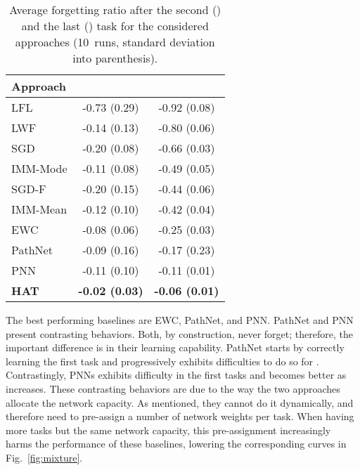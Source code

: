 \begin{table}[t]
    \caption{Average forgetting ratio after the second () and the last () task for the considered approaches (10~runs, standard deviation into parenthesis).}
    \label{tab:mixture0}
\begin{center}
    \begin{small}
    \begin{sc}
    \begin{tabular}{lcc}
    \toprule
    Approach &  &  \\
    \midrule
LFL          & -0.73 (0.29) & -0.92 (0.08) \\
LWF          & -0.14 (0.13) & -0.80 (0.06) \\
SGD          & -0.20 (0.08) & -0.66 (0.03) \\
IMM-Mode     & -0.11 (0.08) & -0.49 (0.05) \\
SGD-F        & -0.20 (0.15) & -0.44 (0.06) \\
IMM-Mean     & -0.12 (0.10) & -0.42 (0.04) \\
EWC          & -0.08 (0.06) & -0.25 (0.03) \\
PathNet      & -0.09 (0.16) & -0.17 (0.23) \\
PNN          & -0.11 (0.10) & -0.11 (0.01) \\
\textbf{HAT}         & \textbf{-0.02 (0.03)} & \textbf{-0.06 (0.01)} \\
	\bottomrule
    \end{tabular}
    \end{sc}
    \end{small}
    \end{center}
    \vskip -0.1in
\end{table}

The best performing baselines are EWC, PathNet, and PNN. PathNet and PNN present contrasting behaviors. Both, by construction, never forget; therefore, the important difference is in their learning capability. PathNet starts by correctly learning the first task and progressively exhibits difficulties to do so for . Contrastingly, PNNs exhibits difficulty in the first tasks and becomes better as  increases. These contrasting behaviors are due to the way the two approaches allocate the network capacity. As mentioned, they cannot do it dynamically, and therefore need to pre-assign a number of network weights per task. When having more tasks but the same network capacity, this pre-assignment increasingly harms the performance of these baselines, lowering the corresponding curves in Fig.~\ref{fig:mixture}.

